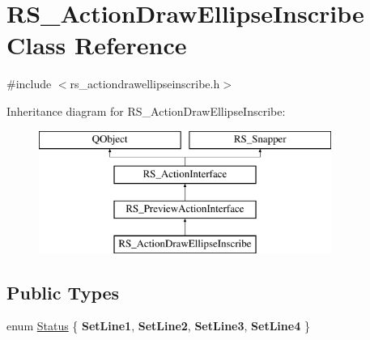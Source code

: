 \hypertarget{classRS__ActionDrawEllipseInscribe}{\section{R\-S\-\_\-\-Action\-Draw\-Ellipse\-Inscribe Class Reference}
\label{classRS__ActionDrawEllipseInscribe}
}


{\ttfamily \#include $<$rs\-\_\-actiondrawellipseinscribe.\-h$>$}

Inheritance diagram for R\-S\-\_\-\-Action\-Draw\-Ellipse\-Inscribe\-:\begin{figure}[H]
\begin{center}
\leavevmode
\includegraphics[height=4.000000cm]{classRS__ActionDrawEllipseInscribe}
\end{center}
\end{figure}
\subsection*{Public Types}
\begin{DoxyCompactItemize}
\item 
enum \hyperlink{classRS__ActionDrawEllipseInscribe_a471a669b31ac8ffc7482c6c9990a304a}{Status} \{ {\bfseries Set\-Line1}, 
{\bfseries Set\-Line2}, 
{\bfseries Set\-Line3}, 
{\bfseries Set\-Line4}
 \}
\end{DoxyCompactItemize}
